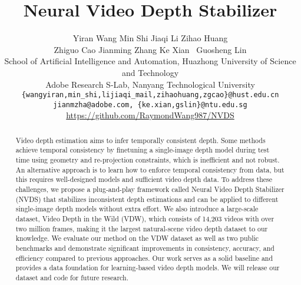 \documentclass[10pt,twocolumn,letterpaper]{article}
\def\framework{Neural Video Depth Stabilizer}
\def\sx{NVDS}
\def\data{VDW}
\begin{document}
\title{Neural Video Depth Stabilizer}





\author{Yiran Wang\hspace{0.1in} 
        Min Shi\hspace{0.1in} 
        Jiaqi Li\hspace{0.1in}
        Zihao Huang\hspace{0.1in} \\
        Zhiguo Cao\hspace{0.1in}
        Jianming Zhang\hspace{0.1in}
        Ke Xian\footnotemark[1]~\hspace{0.1in}
        Guosheng Lin\\
School of Artificial Intelligence and Automation, Huazhong University of Science and Technology\\
Adobe Research\hspace{0.2in} 
S-Lab, Nanyang Technological University\\
{\tt\small \{wangyiran,min\_shi,lijiaqi\_mail,zihaohuang,zgcao\}@hust.edu.cn}\\
{\tt\small jianmzha@adobe.com, \{ke.xian,gslin\}@ntu.edu.sg}\\
{\small{\url{https://github.com/RaymondWang987/NVDS}}}
\vspace{-2mm}
}

\maketitle
\ificcvfinal\thispagestyle{empty}\fi

\renewcommand{\thefootnote}{\fnsymbol{footnote}} 
\begin{abstract} 
   Video depth estimation aims to infer temporally consistent depth. Some methods achieve temporal consistency by finetuning a single-image depth model during test time using geometry and re-projection constraints, which is inefficient and not robust. An alternative approach is to learn how to enforce temporal consistency from data, but this requires well-designed models and sufficient video depth data. To address these challenges, we propose a plug-and-play framework called \framework{} (\sx{}) that stabilizes inconsistent depth estimations and can be applied to different single-image depth models without extra effort. We also introduce a large-scale dataset, Video Depth in the Wild (VDW), which consists of 14,203 videos with over two million frames, making it the largest natural-scene video depth dataset to our knowledge. We evaluate our method on the \data{} dataset as well as two public benchmarks and demonstrate significant improvements in consistency, accuracy, and efficiency compared to previous approaches. Our work serves as a solid baseline and provides a data foundation for learning-based video depth models. We will release our dataset and code for future research.
\end{abstract}
\end{document}
